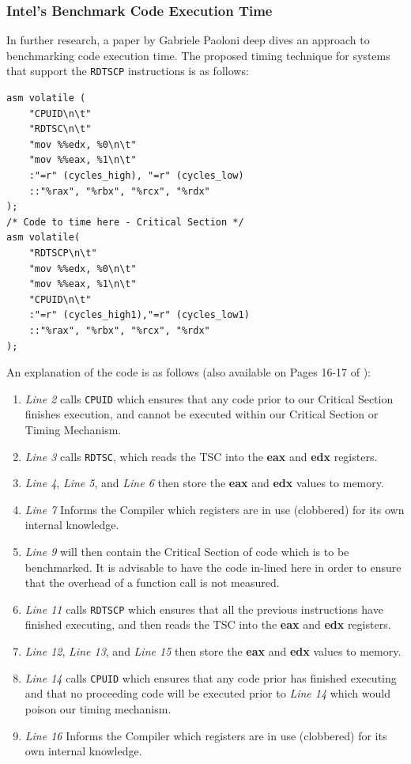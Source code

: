 \documentclass[bsc,frontabs,twoside,singlespacing,parskip,deptreport]{infthesis}     %
\begin{document}
\subsubsection{Intel's Benchmark Code Execution Time\cite{code_exec_times}}
In further research, a paper\cite{code_exec_times} by Gabriele Paoloni deep dives an approach to benchmarking code execution time. The proposed timing technique for systems that support the \texttt{RDTSCP} instructions is as follows:
\begin{verbatim}
asm volatile (
    "CPUID\n\t"
    "RDTSC\n\t"
    "mov %%edx, %0\n\t"
    "mov %%eax, %1\n\t"
    :"=r" (cycles_high), "=r" (cycles_low)
    ::"%rax", "%rbx", "%rcx", "%rdx"
);
/* Code to time here - Critical Section */
asm volatile(
    "RDTSCP\n\t"
    "mov %%edx, %0\n\t"
    "mov %%eax, %1\n\t"
    "CPUID\n\t"
    :"=r" (cycles_high1),"=r" (cycles_low1)
    ::"%rax", "%rbx", "%rcx", "%rdx"
);
\end{verbatim}
An explanation of the code is as follows (also available on Pages 16-17 of \cite{code_exec_times}):
\begin{enumerate}
    \item \textit{Line 2} calls \texttt{CPUID} which ensures that any code prior to our Critical Section finishes execution, and cannot be executed within our Critical Section or Timing Mechanism.
    \item \textit{Line 3} calls \texttt{RDTSC}, which reads the TSC into the \textbf{eax} and \textbf{edx} registers.
    \item \textit{Line 4}, \textit{Line 5}, and \textit{Line 6} then store the \textbf{eax} and \textbf{edx} values to memory.
    \item \textit{Line 7} Informs the Compiler which registers are in use (clobbered) for its own internal knowledge.
    \item \textit{Line 9} will then contain the Critical Section of code which is to be benchmarked. It is advisable to have the code in-lined here in order to ensure that the overhead of a function call is not measured.
    \item \textit{Line 11} calls \texttt{RDTSCP} which ensures that all the previous instructions have finished executing, and then reads the TSC into the \textbf{eax} and \textbf{edx} registers.
    \item \textit{Line 12}, \textit{Line 13}, and \textit{Line 15} then store the \textbf{eax} and \textbf{edx} values to memory.
    \item \textit{Line 14} calls \texttt{CPUID} which ensures that any code prior has finished executing and that no proceeding code will be executed prior to \textit{Line 14} which would poison our timing mechanism.
    \item \textit{Line 16} Informs the Compiler which registers are in use (clobbered) for its own internal knowledge.
\end{enumerate}
\end{document}

